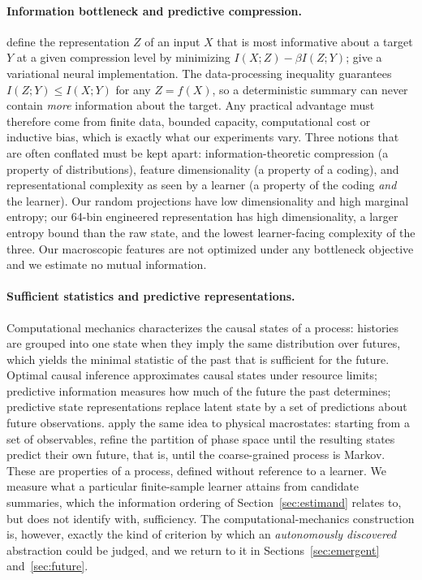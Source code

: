 \documentclass[11pt,a4paper]{article}
\begin{document}
\paragraph{Information bottleneck and predictive compression.}
\citet{tishby2000} define the representation $Z$ of an input $X$ that is most
informative about a target $Y$ at a given compression level by minimizing
$I(X;Z)-\beta I(Z;Y)$; \citet{alemi2017} give a variational neural
implementation. The data-processing inequality guarantees $I(Z;Y)\le I(X;Y)$
for any $Z=f(X)$, so a deterministic summary can never contain \emph{more}
information about the target. Any practical advantage must therefore come from
finite data, bounded capacity, computational cost or inductive bias, which is
exactly what our experiments vary. Three notions that are often conflated must
be kept apart: information-theoretic compression (a property of
distributions), feature dimensionality (a property of a coding), and
representational complexity as seen by a learner (a property of the coding
\emph{and} the learner). Our random projections have low dimensionality and
high marginal entropy; our 64-bin engineered representation has high
dimensionality, a larger entropy bound than the raw state, and the lowest
learner-facing complexity of the three. Our macroscopic features are not
optimized under any bottleneck objective and we estimate no mutual
information.

\paragraph{Sufficient statistics and predictive representations.}
Computational mechanics \citep{shalizi2001,crutchfield2012} characterizes the
causal states of a process: histories are grouped into one state when they
imply the same distribution over futures, which yields the minimal statistic
of the past that is sufficient for the future. Optimal causal inference
\citep{still2010} approximates causal states under resource limits; predictive
information \citep{bialek2001} measures how much of the future the past
determines; predictive state representations \citep{littman2002} replace
latent state by a set of predictions about future observations.
\citet{shalizimoore2003} apply the same idea to physical macrostates: starting
from a set of observables, refine the partition of phase space until the
resulting states predict their own future, that is, until the coarse-grained
process is Markov. These are properties of a process, defined without
reference to a learner. We measure what a particular finite-sample learner
attains from candidate summaries, which the information ordering of
Section~\ref{sec:estimand} relates to, but does not identify with,
sufficiency. The computational-mechanics construction is, however, exactly the
kind of criterion by which an \emph{autonomously discovered} abstraction could
be judged, and we return to it in Sections~\ref{sec:emergent}
and~\ref{sec:future}.
\end{document}
